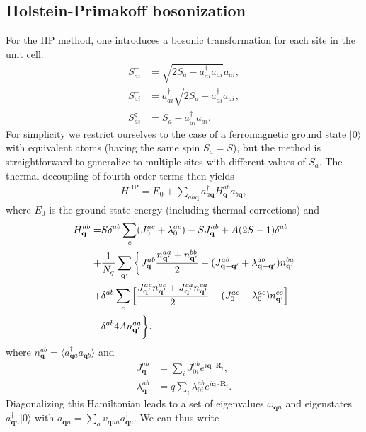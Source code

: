 \documentclass[aps,prb,reprint,floatfix,superscriptaddress]{revtex4-2}
\begin{document}
\subsection{Holstein-Primakoff bosonization}
For the HP method, one introduces a bosonic transformation for each site in the unit cell:
\begin{align}
    S_{ai}^+&=\sqrt{2S_a-a_{ai}^\dag a_{ai}}a_{ai}, \\
    S_{ai}^-& =a_{ai}^\dagger\sqrt{2S_a-a_{ai}^\dagger a_{ai}}, \\
    S^z_{ai}& =S_a-a_{ai}^\dag a_{ai}.
\end{align}
For simplicity we restrict ourselves to the case of a ferromagnetic ground state  $|0\rangle$  with equivalent atoms (having the same spin $S_a=S$), but the method is straightforward to generalize to multiple sites with different values of $S_a$. The thermal decoupling of fourth order terms then yields
\begin{align}
H^\mathrm{HP}=E_0+\sum_{ab\mathbf{q}}a^\dag_{a\mathbf{q}}H_{\mathbf{q}}^{ab}a_{b\mathbf{q}},
\end{align}
where $E_0$ is the ground state energy (including thermal corrections) and
\begin{align}
    H^{ab}_\mathbf{q} =& S\delta^{ab}\sum_{c}(J^{ac}_0 +\lambda^{ac}_0 )- SJ^{ab}_\mathbf{q}+A(2S-1)\delta^{ab}\notag\\
    +& \frac{1}{N_q} \sum_\mathbf{q^\prime}\bigg\{ J^{ab}_\mathbf{q} \frac{n^{aa}_\mathbf{q^\prime}+ n^{bb}_\mathbf{q^\prime}}{2} -(J^{ab}_{\mathbf{q}-\mathbf{q}'}+\lambda^{ab}_{\mathbf{q}-\mathbf{q}'} ) n^{ba}_\mathbf{q^\prime} \notag\\
    +&\delta^{ab}\sum_c\Big[\frac{J^{ac}_\mathbf{q^\prime} n^{ac}_\mathbf{q^\prime}+J^{ca}_\mathbf{q^\prime} n^{ca}_\mathbf{q^\prime} }{2}
    -(J^{ac}_0 + \lambda^{ac}_0 ) n^{cc}_\mathbf{q^\prime}\Big] \notag\\
    -&\delta^{ab}4An^{aa}_\mathbf{q^\prime}\bigg\}.
\end{align}
where $n^{ab}_\mathbf{q}=\langle a^\dag_{\mathbf{q}a}a_{\mathbf{q}b}\rangle$ and 
\begin{align}
    J^{ab}_\mathbf{q} &= \sum_i J^{ab}_{0i} e^{i \mathbf{q} \cdot \mathbf{R}_i} ,\label{2siteJab}\\
    \lambda^{ab}_\mathbf{q} &=q \sum_i \lambda^{ab}_{0i} e^{i \mathbf{q} \cdot \mathbf{R}_i}. \label{2SiteAE}
\end{align}
Diagonalizing this Hamiltonian leads to a set of eigenvalues $\omega_{\mathbf{q}n}$ and eigenstates $a^\dag_{\mathbf{q}n}|0\rangle$ with $a^\dag_{\mathbf{q}n}=\sum_av_{\mathbf{q}na}a^\dag_{\mathbf{q}a}$. We can thus write
\end{document}
